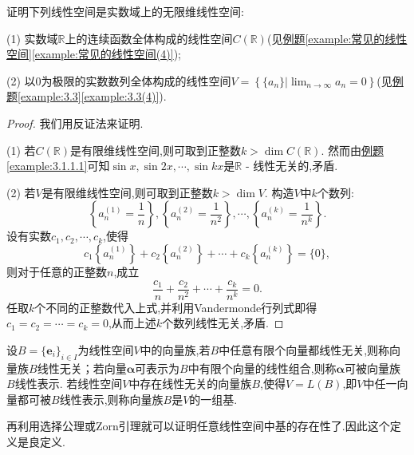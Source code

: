 \documentclass[../../main.tex]{subfiles}
\begin{document}
\begin{example}
证明下列线性空间是实数域上的无限维线性空间:

(1) 实数域\(\mathbb{R}\)上的连续函数全体构成的线性空间\(C(\mathbb{R})\)(见\hyperref[example:常见的线性空间(4)]{例题\ref{example:常见的线性空间}\ref{example:常见的线性空间(4)}});

(2) 以\(0\)为极限的实数数列全体构成的线性空间\(V = \left\{\{a_n\}|\lim_{n\rightarrow\infty}a_n = 0\right\}\)(见\hyperref[example:3.3(4)]{例题\ref{example:3.3}\ref{example:3.3(4)}}).
\end{example}
\begin{proof}
我们用反证法来证明.

(1) 若\(C(\mathbb{R})\)是有限维线性空间,则可取到正整数\(k>\dim C(\mathbb{R})\). 然而由\hyperref[example:3.1.1.1]{例题\ref{example:3.1.1.1}}可知\(\sin x,\sin 2x,\cdots,\sin kx\)是\(\mathbb{R}\) - 线性无关的,矛盾.

(2) 若\(V\)是有限维线性空间,则可取到正整数\(k>\dim V\). 构造\(V\)中\(k\)个数列:
\[
\left\{a_n^{(1)}=\frac{1}{n}\right\},\left\{a_n^{(2)}=\frac{1}{n^2}\right\},\cdots,\left\{a_n^{(k)}=\frac{1}{n^k}\right\}.
\]
设有实数\(c_1,c_2,\cdots,c_k\),使得
\[
c_1\left\{a_n^{(1)}\right\}+c_2\left\{a_n^{(2)}\right\}+\cdots + c_k\left\{a_n^{(k)}\right\}=\{0\},
\]
则对于任意的正整数\(n\),成立
\[
\frac{c_1}{n}+\frac{c_2}{n^2}+\cdots+\frac{c_k}{n^k}=0.
\]
任取\(k\)个不同的正整数代入上式,并利用Vandermonde行列式即得\(c_1 = c_2=\cdots = c_k = 0\),从而上述\(k\)个数列线性无关,矛盾. 
\end{proof}

\begin{definition}[无限维空间基的定义]\label{definition:无限维空间基的定义}
设\(B = \{ \boldsymbol{e}_i\}_{i\in I}\)为线性空间\(V\)中的向量族,若\(B\)中任意有限个向量都线性无关,则称向量族\(B\)线性无关；若向量\(\boldsymbol{\alpha}\)可表示为\(B\)中有限个向量的线性组合,则称\(\boldsymbol{\alpha}\)可被向量族\(B\)线性表示. 若线性空间\(V\)中存在线性无关的向量族\(B\),使得\(V = L(B)\),即\(V\)中任一向量都可被\(B\)线性表示,则称向量族\(B\)是\(V\)的一组基.
\end{definition}
\begin{note}
再利用选择公理或Zorn引理就可以证明任意线性空间中基的存在性了.因此这个定义是良定义.
\end{note}
\end{document}
